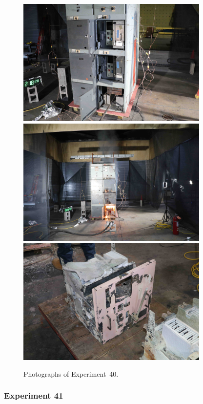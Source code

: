\begin{figure}[p]
\centering
\includegraphics[height=2.50in]{../FIGURES/Test_40_setup} \\
\includegraphics[height=2.50in]{../FIGURES/Test_40_7_min_26_s} \\
\includegraphics[height=2.50in]{../FIGURES/Test_40_breaker}
\caption[Photographs of Experiment~40]{Photographs of Experiment~40.}
\label{fig:Test_40_photos}
\end{figure}


\clearpage

\subsubsection{Experiment 41}

